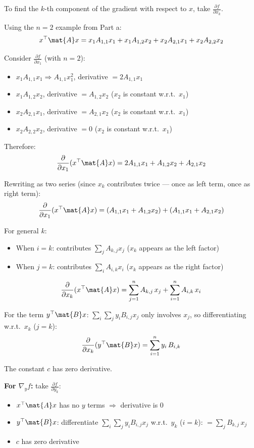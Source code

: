 \documentclass{article}
\begin{document}
\begin{aprob}
    To find the $k$-th component of the gradient with respect to $x$, take $\frac{\partial f}{\partial x_k}$.

    \medskip
    Using the $n=2$ example from Part a:
    \[
        x^\top \mat{A} x = x_1 A_{1,1} x_1 + x_1 A_{1,2} x_2 + x_2 A_{2,1} x_1 + x_2 A_{2,2} x_2
    \]

    Consider $\frac{\partial f}{\partial x_1}$ (with $n=2$):
    \begin{itemize}
        \item $x_1 A_{1,1} x_1 \Rightarrow A_{1,1} x_1^2$, derivative $= 2A_{1,1} x_1$
        \item $x_1 A_{1,2} x_2$, derivative $= A_{1,2} x_2$ ($x_2$ is constant w.r.t.\ $x_1$)
        \item $x_2 A_{2,1} x_1$, derivative $= A_{2,1} x_2$ ($x_2$ is constant w.r.t.\ $x_1$)
        \item $x_2 A_{2,2} x_2$, derivative $= 0$ ($x_2$ is constant w.r.t.\ $x_1$)
    \end{itemize}

    Therefore:
    \[
        \frac{\partial}{\partial x_1}(x^\top \mat{A} x) = 2A_{1,1} x_1 + A_{1,2} x_2 + A_{2,1} x_2
    \]

    Rewriting as two series (since $x_k$ contributes twice --- once as left term, once as right term):
    \[
        \frac{\partial}{\partial x_1}(x^\top \mat{A} x) = (A_{1,1} x_1 + A_{1,2} x_2) + (A_{1,1} x_1 + A_{2,1} x_2)
    \]

    For general $k$:
    \begin{itemize}
        \item When $i = k$: contributes $\sum_j A_{k,j} x_j$ ($x_k$ appears as the left factor)
        \item When $j = k$: contributes $\sum_i A_{i,k} x_i$ ($x_k$ appears as the right factor)
    \end{itemize}
    \[
        \frac{\partial}{\partial x_k}(x^\top \mat{A} x) = \sum_{j=1}^n A_{k,j}\, x_j + \sum_{i=1}^n A_{i,k}\, x_i
    \]

    For the term $y^\top \mat{B} x$: $\sum_i \sum_j y_i B_{i,j} x_j$ only involves $x_j$, so differentiating w.r.t.\ $x_k$ ($j = k$):
    \[
        \frac{\partial}{\partial x_k}(y^\top \mat{B} x) = \sum_{i=1}^n y_i\, B_{i,k}
    \]

    The constant $c$ has zero derivative.

    \medskip
    \textbf{For $\nabla_y f$:} take $\frac{\partial f}{\partial y_k}$:
    \begin{itemize}
        \item $x^\top \mat{A} x$ has no $y$ terms $\Rightarrow$ derivative is 0
        \item $y^\top \mat{B} x$: differentiate $\sum_i \sum_j y_i B_{i,j} x_j$ w.r.t.\ $y_k$ ($i = k$): $= \sum_j B_{k,j}\, x_j$
        \item $c$ has zero derivative
    \end{itemize}


\end{aprob}
\end{document}
